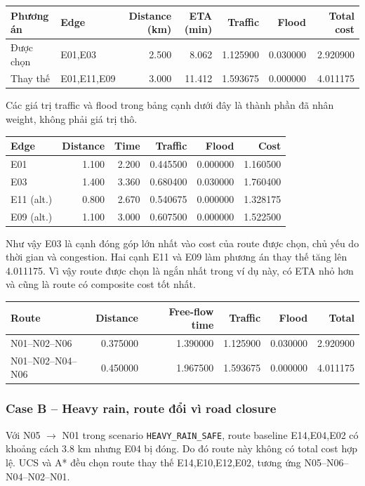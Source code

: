 \begin{center}
{\scriptsize
\begin{tabular}{l l r r r r r}
\toprule
Phương án & Edge & Distance (km) & ETA (min) & Traffic & Flood & Total cost\\
\midrule
Được chọn & E01,E03 & 2.500 & 8.062 & 1.125900 & 0.030000 & 2.920900\\
Thay thế & E01,E11,E09 & 3.000 & 11.412 & 1.593675 & 0.000000 & 4.011175\\
\bottomrule
\end{tabular}
}
\end{center}

Các giá trị traffic và flood trong bảng cạnh dưới đây là thành phần đã nhân weight, không phải giá trị thô.
\begin{center}
{\scriptsize
\begin{tabular}{l r r r r r}
\toprule
Edge & Distance & Time & Traffic & Flood & Cost\\
\midrule
E01 & 1.100 & 2.200 & 0.445500 & 0.000000 & 1.160500\\
E03 & 1.400 & 3.360 & 0.680400 & 0.030000 & 1.760400\\
\midrule
E11 (alt.) & 0.800 & 2.670 & 0.540675 & 0.000000 & 1.328175\\
E09 (alt.) & 1.100 & 3.000 & 0.607500 & 0.000000 & 1.522500\\
\bottomrule
\end{tabular}
}
\end{center}
Như vậy E03 là cạnh đóng góp lớn nhất vào cost của route được chọn, chủ yếu do thời gian và congestion. Hai cạnh E11 và E09 làm phương án thay thế tăng lên 4.011175. Vì vậy route được chọn là ngắn nhất trong ví dụ này, có ETA nhỏ hơn và cũng là route có composite cost tốt nhất.

\begin{center}
{\scriptsize
\begin{tabular}{l r r r r r}
\toprule
Route & Distance & Free-flow time & Traffic & Flood & Total\\
\midrule
N01--N02--N06 & 0.375000 & 1.390000 & 1.125900 & 0.030000 & 2.920900\\
N01--N02--N04--N06 & 0.450000 & 1.967500 & 1.593675 & 0.000000 & 4.011175\\
\bottomrule
\end{tabular}
}
\end{center}

\subsubsection{Case B -- Heavy rain, route đổi vì road closure}
Với N05 \(\rightarrow\) N01 trong scenario \texttt{HEAVY\_RAIN\_SAFE}, route baseline E14,E04,E02 có khoảng cách 3.8 km nhưng E04 bị đóng. Do đó route này không có total cost hợp lệ. UCS và A* đều chọn route thay thế E14,E10,E12,E02, tương ứng N05--N06--N04--N02--N01.


